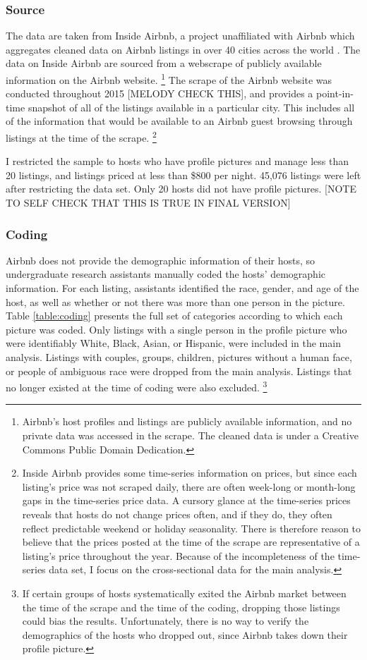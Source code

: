 \subsubsection*{Source} 
The data are taken from Inside Airbnb, a project unaffiliated with Airbnb which aggregates cleaned data on Airbnb listings in over 40 cities across the world \citep{insideairbnb}. The data on Inside Airbnb are sourced from a webscrape of publicly available information on the Airbnb website.%
	\footnote{Airbnb's host profiles and listings are publicly available information, and no private data was accessed in the scrape. The cleaned data is under a Creative Commons Public Domain Dedication.} 
The scrape of the Airbnb website was conducted throughout 2015 [MELODY CHECK THIS], and provides a point-in-time snapshot of all of the listings available in a particular city. This includes all of the information that would be available to an Airbnb guest browsing through listings at the time of the scrape.%
	\footnote{Inside Airbnb provides some time-series information on prices, but since each listing's price was not scraped daily, there are often week-long or month-long gaps in the time-series price data. A cursory glance at the time-series prices reveals that hosts do not change prices often, and if they do, they often reflect predictable weekend or holiday seasonality. There is therefore reason to believe that the prices posted at the time of the scrape are representative of a listing's price throughout the year. Because of the incompleteness of the time-series data set, I focus on the cross-sectional data for the main analysis.} 

I restricted the sample to hosts who have profile pictures and manage less than 20 listings, and listings priced at less than \$800 per night. 45,076 listings were left after restricting the data set. Only 20 hosts did not have profile pictures. [NOTE TO SELF CHECK THAT THIS IS TRUE IN FINAL VERSION]

\subsubsection*{Coding} 
Airbnb does not provide the demographic information of their hosts, so undergraduate research assistants manually coded the hosts' demographic information. For each listing, assistants identified the race, gender, and age of the host, as well as whether or not there was more than one person in the picture. Table \ref{table:coding} presents the full set of categories according to which each picture was coded. Only listings with a single person in the profile picture who were identifiably White, Black, Asian, or Hispanic, were included in the main analysis. Listings with couples, groups, children, pictures without a human face, or people of ambiguous race were dropped from the main analysis. Listings that no longer existed at the time of coding were also excluded.%
	\footnote{If certain groups of hosts systematically exited the Airbnb market between the time of the scrape and the time of the coding, dropping those listings could bias the results. Unfortunately, there is no way to verify the demographics of the hosts who dropped out, since Airbnb takes down their profile picture.}

